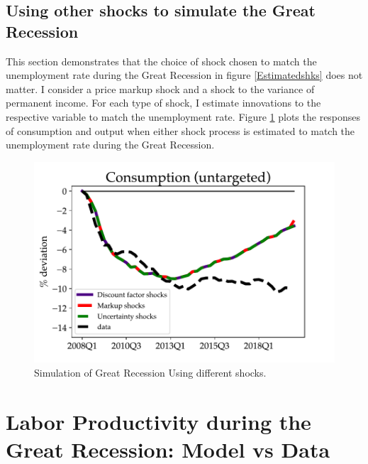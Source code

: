 





\subsection{Using other shocks to simulate the Great Recession}

This section demonstrates that the choice of shock chosen to match the unemployment rate during the Great Recession in figure \ref{Estimatedshks} does not matter. I consider a price markup shock and a shock to the variance of permanent income. For each type of shock, I estimate innovations to the respective variable to match the unemployment rate.  Figure \ref{other_shocks} plots the responses of consumption and output when either shock process is estimated to match the unemployment rate during the Great Recession.
\begin{figure}[!ht]
    \centering
   \begin{minipage}{0.47\textwidth}
        \centering
        \includegraphics[scale=.6]{text/Chapter1/Figures/GR_sim/C_comparisons} %
    \end{minipage}\hfill
    \caption{Simulation of Great Recession Using different shocks.}
    \label{other_shocks}
\end{figure}





\section{Labor Productivity during the Great Recession: Model vs Data}


